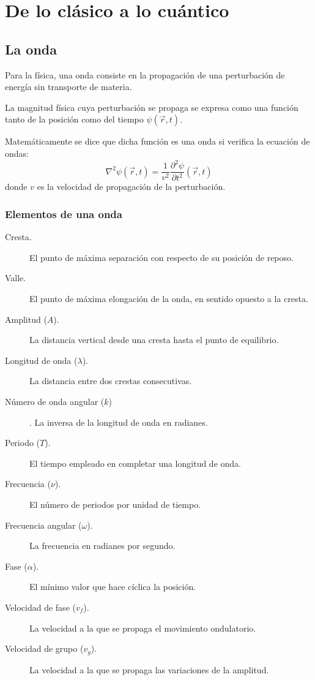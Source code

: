 \chapter{De lo clásico a lo cuántico}
\section{La onda}\label{sec:la-onda}

Para la física, una onda consiste en la propagación de una perturbación de energía sin transporte de materia.

La magnitud física cuya perturbación se propaga se expresa como una función tanto de la posición como del tiempo
$\psi(\vec{r},t)$.

Matemáticamente se dice que dicha función es una onda si verifica la ecuación de ondas:
\begin{equation}
    \label{eq:ecuacion-onda}
    \nabla^2\psi(\vec {r},t)=\frac {1}{v^2}\frac{\partial^2\psi}{\partial t^2}(\vec {r},t)
\end{equation}
donde $v$ es la velocidad de propagación de la perturbación.

\subsection{Elementos de una onda}\label{subsec:elementos-de-una-onda}

\begin{description}
    \item[Cresta.] El punto de máxima separación con respecto de su posición de reposo.
    \item[Valle.] El punto de máxima elongación de la onda, en sentido opuesto a la cresta.
    \item[Amplitud ($A$).] La distancia vertical desde una cresta hasta el punto de equilibrio.
    \item[Longitud de onda ($\lambda$).] La distancia entre dos crestas consecutivas.
    \item[Número de onda angular ($k$)]. La inversa de la longitud de onda en radianes.
    \item[Periodo ($T$).] El tiempo empleado en completar una longitud de onda.
    \item[Frecuencia ($\nu$).] El número de periodos por unidad de tiempo.
    \item[Frecuencia angular ($\omega$).] La frecuencia en radianes por segundo.
    \item[Fase ($\alpha$).] El mínimo valor que hace cíclica la posición.
    \item[Velocidad de fase ($v_f$).] La velocidad a la que se propaga el movimiento ondulatorio.
    \item[Velocidad de grupo ($v_g$).] La velocidad a la que se propaga las variaciones de la amplitud.
\end{description}

